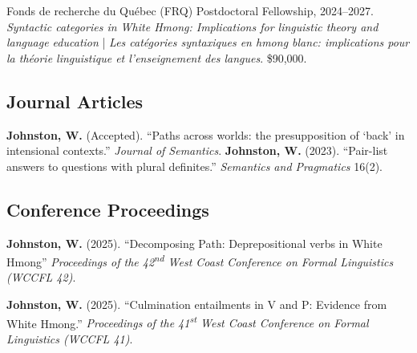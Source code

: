 \documentclass[11pt,oneside,letterpaper]{johnstoncv}
\begin{document}
\begin{entries}
\Item Fonds de recherche du Québec (FRQ) Postdoctoral Fellowship, 2024--2027.\\ \textit{Syntactic categories in White Hmong: Implications for linguistic theory and language education} | \textit{Les catégories syntaxiques en hmong blanc: implications pour la théorie linguistique et l'enseignement des langues}. \$90,000. 

\subsection{Journal Articles}

 \textbf{Johnston, W.} (Accepted). ``Paths across worlds: the presupposition of `back' in intensional contexts.'' \textit{Journal of Semantics}.
 \textbf{Johnston, W.} (2023). ``Pair-list answers to questions with plural definites.'' \textit{Semantics and Pragmatics} 16(2).


\subsection{Conference Proceedings}


 \textbf{Johnston, W.} (2025). ``Decomposing Path: Deprepositional verbs in White Hmong'' \textit{Proceedings of the 42\textsuperscript{nd} West Coast Conference on Formal Linguistics (WCCFL 42)}.

 \textbf{Johnston, W.} (2025). ``Culmination entailments in V and P: Evidence from White Hmong.'' \textit{Proceedings of the 41\textsuperscript{st} West Coast Conference on Formal Linguistics (WCCFL 41)}.


\end{entries}
\end{document}
